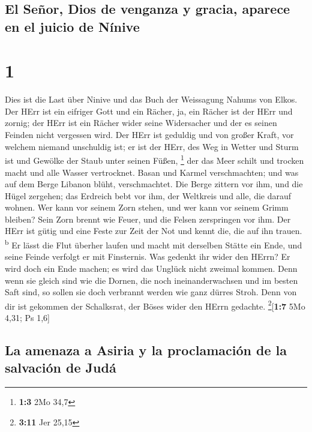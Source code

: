 \hypertarget{el-seuxf1or-dios-de-venganza-y-gracia-aparece-en-el-juicio-de-nuxednive}{%
\subsection{El Señor, Dios de venganza y gracia, aparece en el juicio de
Nínive}\label{el-seuxf1or-dios-de-venganza-y-gracia-aparece-en-el-juicio-de-nuxednive}}

\hypertarget{section}{%
\section{1}\label{section}}

 Dies ist die Last über Ninive und das Buch der Weissagung
Nahums von Elkos.  Der HErr ist ein eifriger Gott und ein
Rächer, ja, ein Rächer ist der HErr und zornig; der HErr ist ein Rächer
wider seine Widersacher und der es seinen Feinden nicht vergessen wird.
 Der HErr ist geduldig und von großer Kraft, vor welchem
niemand unschuldig ist; er ist der HErr, des Weg in Wetter und Sturm ist
und Gewölke der Staub unter seinen Füßen, \footnote{\textbf{1:3} 2Mo
  34,7}  der das Meer schilt und trocken macht und alle
Wasser vertrocknet. Basan und Karmel verschmachten; und was auf dem
Berge Libanon blüht, verschmachtet.  Die Berge zittern vor
ihm, und die Hügel zergehen; das Erdreich bebt vor ihm, der Weltkreis
und alle, die darauf wohnen.  Wer kann vor seinem Zorn
stehen, und wer kann vor seinem Grimm bleiben? Sein Zorn brennt wie
Feuer, und die Felsen zerspringen vor ihm.  Der HErr ist
gütig und eine Feste zur Zeit der Not und kennt die, die auf ihn trauen.
\textsuperscript{b}  Er lässt die Flut überher laufen und
macht mit derselben Stätte ein Ende, und seine Feinde verfolgt er mit
Finsternis.  Was gedenkt ihr wider den HErrn? Er wird doch
ein Ende machen; es wird das Unglück nicht zweimal kommen.
 Denn wenn sie gleich sind wie die Dornen, die noch
ineinanderwachsen und im besten Saft sind, so sollen sie doch verbrannt
werden wie ganz dürres Stroh.  Denn von dir ist gekommen
der Schalksrat, der Böses wider den HErrn gedachte.
\footnote{\textbf{3:11} Jer 25,15}{[}\textbf{1:7} 5Mo 4,31; Ps 1,6{]}

\hypertarget{la-amenaza-a-asiria-y-la-proclamaciuxf3n-de-la-salvaciuxf3n-de-juduxe1}{%
\subsection{La amenaza a Asiria y la proclamación de la salvación de
Judá}\label{la-amenaza-a-asiria-y-la-proclamaciuxf3n-de-la-salvaciuxf3n-de-juduxe1}}


